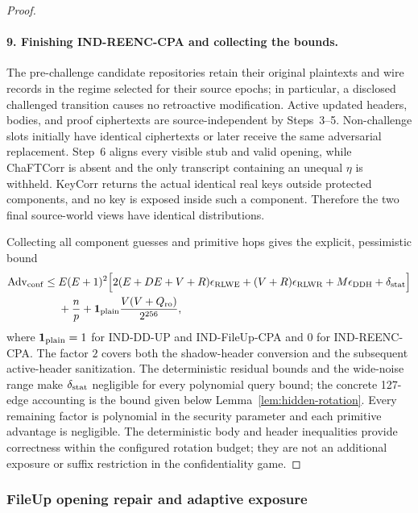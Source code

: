 \begin{proof}
\paragraph{9. Finishing IND-REENC-CPA and collecting the bounds.}
The pre-challenge candidate repositories retain their original plaintexts and wire records in the regime selected for their source epochs; in particular, a disclosed challenged transition causes no retroactive modification. Active updated headers, bodies, and proof ciphertexts are source-independent by Steps~3--5. Non-challenge slots initially have identical ciphertexts or later receive the same adversarial replacement. Step~6 aligns every visible stub and valid opening, while ChaFTCorr is absent and the only transcript containing an unequal $\eta$ is withheld. KeyCorr returns the actual identical real keys outside protected components, and no key is exposed inside such a component. Therefore the two final source-world views have identical distributions.

Collecting all component guesses and primitive hops gives the explicit, pessimistic bound
\[
\begin{aligned}
\operatorname{Adv}_{\rm conf}\le{}& E(E+1)^2\Big[2(E+DE+V+R)\epsilon_{\rm RLWE}
 +(V+R)\epsilon_{\rm RLWR}+M\epsilon_{\rm DDH}+\delta_{\rm stat}\Big]\\
 &+\frac{n}{p}+\mathbf 1_{\rm plain}\frac{V(V+Q_{\rm ro})}{2^{256}},
\end{aligned}
\]
where $\mathbf 1_{\rm plain}=1$ for IND-DD-UP and IND-FileUp-CPA and $0$ for IND-REENC-CPA. The factor $2$ covers both the shadow-header conversion and the subsequent active-header sanitization. The deterministic residual bounds and the wide-noise range make $\delta_{\rm stat}$ negligible for every polynomial query bound; the concrete 127-edge accounting is the bound given below Lemma~\ref{lem:hidden-rotation}. Every remaining factor is polynomial in the security parameter and each primitive advantage is negligible. The deterministic body and header inequalities provide correctness within the configured rotation budget; they are not an additional exposure or suffix restriction in the confidentiality game.
\end{proof}

\subsubsection{FileUp opening repair and adaptive exposure}
\label{sec:fileup-repair}

